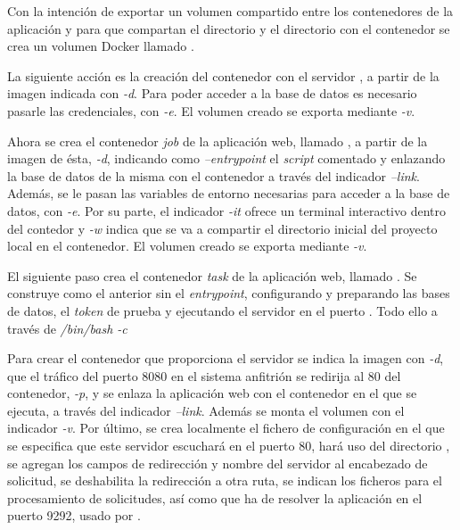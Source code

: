 Con la intención de exportar un volumen compartido entre los contenedores de la aplicación y  para que compartan el directorio  y el directorio  con el contenedor  se crea un volumen Docker llamado .

La siguiente acción es la creación del contenedor  con el servidor , a partir de la imagen  indicada con \textit{\--d}. Para poder acceder a la base de datos es necesario pasarle las credenciales, con \textit{\--e}. El volumen creado se exporta mediante \textit{\--v}.

Ahora se crea el contenedor \textit{job} de la aplicación web, llamado , a partir de la imagen de ésta, \textit{\--d}, indicando como \textit{\---entrypoint} el \textit{script} comentado y enlazando la base de datos de la misma con el contenedor  a través del indicador \textit{\---link}. Además, se le pasan las variables de entorno necesarias para acceder a la base de datos, con \textit{\--e}. Por su parte, el indicador \textit{\--it} ofrece un terminal interactivo dentro del contedor y \textit{\--w} indica que se va a compartir el directorio inicial del proyecto local en el contenedor. El volumen creado se exporta mediante \textit{\--v}.

El siguiente paso crea el contenedor \textit{task} de la aplicación web, llamado . Se construye como el anterior sin el \textit{entrypoint}, configurando y preparando las bases de datos, el \textit{token} de prueba y ejecutando el servidor  en el puerto . Todo ello a través de \textit{/bin/bash \--c}

Para crear el contenedor  que proporciona el servidor  se indica la imagen con \textit{\--d}, que el tráfico del puerto 8080 en el sistema anfitrión se redirija al 80 del contenedor, \textit{\--p}, y se enlaza la aplicación web con el contenedor en el que se ejecuta, a través del indicador \textit{\---link}. Además se monta el volumen  con el indicador \textit{\--v}. Por último, se crea localmente el fichero de configuración  en el que se especifica que este servidor escuchará en el puerto 80, hará uso del directorio , se agregan los campos de redirección y nombre del servidor al encabezado de solicitud, se deshabilita la redirección a otra ruta, se indican los ficheros para el procesamiento de solicitudes, así como que ha de resolver la aplicación en el puerto 9292, usado por .  

